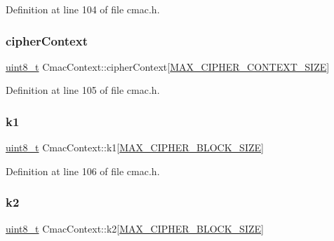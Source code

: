 Definition at line 104 of file cmac.\+h.

\mbox{\label{structCmacContext_a30e362e52be60ba1407fffeb5d6957ec}} 
\subsubsection{\texorpdfstring{cipher\+Context}{cipherContext}}
{\footnotesize\ttfamily \hyperlink{stdint_8h_aba7bc1797add20fe3efdf37ced1182c5}{uint8\+\_\+t} Cmac\+Context\+::cipher\+Context\mbox{[}\hyperlink{cyclone__crypto_2core_2crypto_8h_a99fb8f5b5cc906fd435df00c1720f7ad}{M\+A\+X\+\_\+\+C\+I\+P\+H\+E\+R\+\_\+\+C\+O\+N\+T\+E\+X\+T\+\_\+\+S\+I\+ZE}\mbox{]}}



Definition at line 105 of file cmac.\+h.

\mbox{\label{structCmacContext_a5a42e4c3d8057ef628192ac02df4f14e}} 
\subsubsection{\texorpdfstring{k1}{k1}}
{\footnotesize\ttfamily \hyperlink{stdint_8h_aba7bc1797add20fe3efdf37ced1182c5}{uint8\+\_\+t} Cmac\+Context\+::k1\mbox{[}\hyperlink{cyclone__crypto_2core_2crypto_8h_ad7d23a73335aef1d701df177a8f92b80}{M\+A\+X\+\_\+\+C\+I\+P\+H\+E\+R\+\_\+\+B\+L\+O\+C\+K\+\_\+\+S\+I\+ZE}\mbox{]}}



Definition at line 106 of file cmac.\+h.

\mbox{\label{structCmacContext_a2ba78c0c3c708c399afba99350f07aea}} 
\subsubsection{\texorpdfstring{k2}{k2}}
{\footnotesize\ttfamily \hyperlink{stdint_8h_aba7bc1797add20fe3efdf37ced1182c5}{uint8\+\_\+t} Cmac\+Context\+::k2\mbox{[}\hyperlink{cyclone__crypto_2core_2crypto_8h_ad7d23a73335aef1d701df177a8f92b80}{M\+A\+X\+\_\+\+C\+I\+P\+H\+E\+R\+\_\+\+B\+L\+O\+C\+K\+\_\+\+S\+I\+ZE}\mbox{]}}




